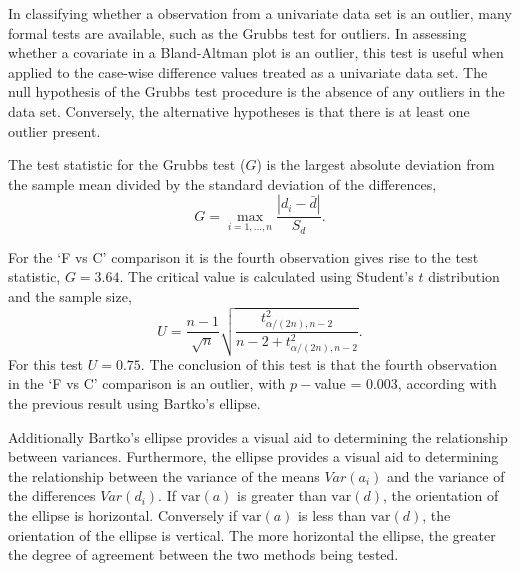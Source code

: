 \documentclass[12pt, a4paper]{report}
\theoremstyle{plain}
\theoremstyle{definition}
\theoremstyle{remark}
\begin{document}
	

	
	
	In classifying whether a observation from a univariate data set is
	an outlier, many formal tests are available, such as the Grubbs test for outliers. In assessing
	whether a covariate in a Bland-Altman plot is an outlier, this
	test is useful when applied to the case-wise difference values treated as a
	univariate data set. The null hypothesis of the Grubbs test procedure is the absence
	of any outliers in the data set. Conversely, the alternative hypotheses is that there is at least one outlier
	present.
	
	The test statistic for the Grubbs test ($G$) is the largest
	absolute deviation from the sample mean divided by the standard
	deviation of the differences,
	\[
	G =  \displaystyle\max_{i=1,\ldots, n}\frac{\left \vert d_i -
		\bar{d}\right\vert}{S_{d}}.
	\]
	
	For the `F vs C' comparison it is the fourth observation gives
	rise to the test statistic, $G = 3.64$. The critical value is
	calculated using Student's $t$ distribution and the sample size,
	\[
	U = \frac{n-1}{\sqrt{n}} \sqrt{\frac{t_{\alpha/(2n),n-2}^2}{n - 2
			+ t_{\alpha/(2n),n-2}^2}}.
	\]
	For this test $U = 0.75$. The conclusion of this test is that the fourth observation in the `F vs C' comparison is an outlier, with $p-$value = 0.003, according with the previous result using Bartko's ellipse.
	
		
		Additionally Bartko's ellipse provides a visual aid to determining the
		relationship between variances. 
		Furthermore, the ellipse provides a visual aid to determining the relationship
		between the variance of the means $Var(a_{i})$ and the variance of the differences $Var(d_{i})$. If $\mbox{var}(a)$ is greater than $\mbox{var}(d)$, the orientation of the ellipse is horizontal. Conversely if $\mbox{var}(a)$ is less than $\mbox{var}(d)$, the orientation of the ellipse is vertical. The more horizontal the ellipse, the greater the degree of agreement between the two methods being tested.
		
\end{document}
